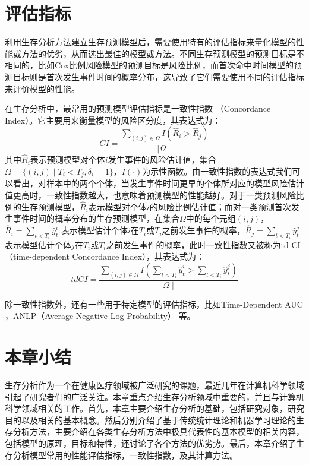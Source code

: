 \section{评估指标}

利用生存分析方法建立生存预测模型后，需要使用特有的评估指标来量化模型的性能或方法的优劣，从而选出最佳的模型或方法。不同生存预测模型的预测目标是不相同的，比如Cox比例风险模型的预测目标是风险比例，而首次命中时间模型的预测目标则是首次发生事件时间的概率分布，这导致了它们需要使用不同的评估指标来评价模型的性能。

在生存分析中，最常用的预测模型评估指标是一致性指数 （Concordance Index）。它主要用来衡量模型的风险区分度，其表达式为：
\begin{equation}
CI=\frac{\sum_{(i,j)\in \Omega} I(\hat{R}_i > \hat{R}_j)}{\mid \Omega \mid} \label{F13}
\end{equation}
其中$\hat{R}_i$表示预测模型对个体$i$发生事件的风险估计值，集合$\Omega=\{(i,j)\mid T_i<T_j,\delta_i=1\}$，$I(\cdot)$为示性函数。由一致性指数的表达式我们可以看出，对样本中的两个个体，当发生事件时间更早的个体所对应的模型风险估计值更高时，一致性指数越大，也意味着预测模型的性能越好。对于一类预测风险比例的生存预测模型，$\hat{R}_i$表示模型对个体$i$的风险比例估计值；而对一类预测首次发生事件时间的概率分布的生存预测模型，在集合$\Omega$中的每个元组$(i,j)$，$\hat{R}_i=\sum_{t<T_i} \hat{y}_t^i$ 表示模型估计个体$i$在$T_i$或$T_i$之前发生事件的概率，$\hat{R}_j=\sum_{t<T_i} \hat{y}_t^j$ 表示模型估计个体$j$在$T_i$或$T_i$之前发生事件的概率，此时一致性指数又被称为td-CI （time-dependent Concordance Index），其表达式为：
\begin{equation}
tdCI=\frac{\sum_{(i,j)\in \Omega} I(\sum_{t<T_i} \hat{y}_t^i > \sum_{t<T_i} \hat{y}_t^j)}{\mid \Omega \mid} \label{F14}
\end{equation}

除一致性指数外，还有一些用于特定模型的评估指标，比如Time-Dependent AUC ，ANLP（Average Negative Log Probability） 等。

\section{本章小结}

生存分析作为一个在健康医疗领域被广泛研究的课题，最近几年在计算机科学领域引起了研究者们的广泛关注。本章重点介绍生存分析领域中重要的，并且与计算机科学领域相关的工作。首先，本章主要介绍生存分析的基础，包括研究对象，研究目的以及相关的基本概念。然后分别介绍了基于传统统计理论和机器学习理论的生存分析方法，主要介绍在各类生存分析方法中极具代表性的基本模型的相关内容，包括模型的原理，目标和特性，还讨论了各个方法的优劣势。最后，本章介绍了生存分析模型常用的性能评估指标，一致性指数，及其计算方法。
